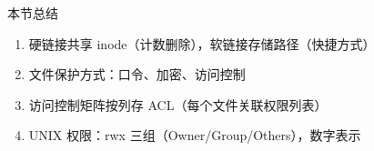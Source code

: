\documentclass[10pt, aspectratio=169]{beamer}
\begin{document}
\begin{frame}{本节总结}
    \begin{enumerate}
        \item 硬链接共享 inode（计数删除），软链接存储路径（快捷方式）
        \item 文件保护方式：口令、加密、访问控制
        \item 访问控制矩阵按列存 ACL（每个文件关联权限列表）
        \item UNIX 权限：rwx 三组（Owner/Group/Others），数字表示
    \end{enumerate}
\end{frame}
\end{document}
